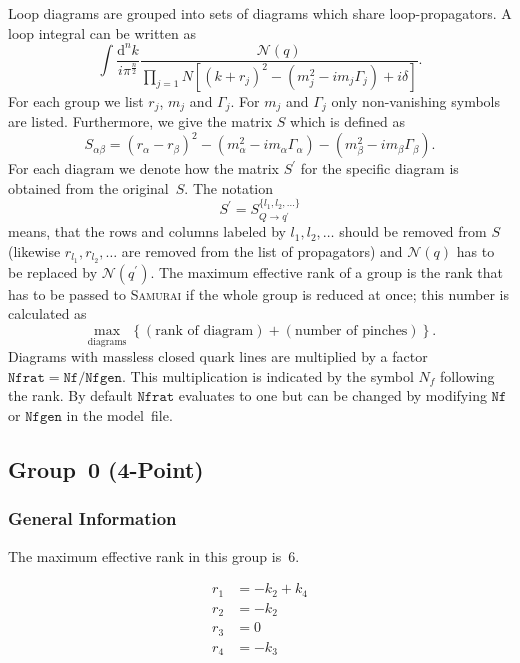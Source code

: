 \documentclass[a4paper]{article}
\begin{document}
Loop diagrams are grouped into sets of diagrams which share
loop-propagators. A loop integral can be written as
\begin{equation}
\int\!\frac{\mathrm{d}^nk}{i\pi^{\frac{n}{2}}}%
\frac{\mathcal{N}(q)}{\prod_{j=1}{N}\left[(k+r_j)^2-(m_j^2
   -i m_j\Gamma_j) + i\delta\right]}.
\end{equation}
For each group we list $r_j$, $m_j$ and $\Gamma_j$.
For $m_j$ and $\Gamma_j$ only non-vanishing symbols are listed.
Furthermore, we give the matrix $S$ which is defined as
\begin{equation}
S_{\alpha\beta} = (r_\alpha-r_\beta)^2
-(m_\alpha^2-im_\alpha\Gamma_\alpha)
-(m_\beta^2-im_\beta\Gamma_\beta).
\end{equation}
For each diagram we denote how the matrix $S^\prime$ for the specific diagram
is obtained from the original~$S$. The notation
\begin{equation}
S^\prime=S_{Q\to q^\prime}^{\{l_1,l_2,\ldots\}}
\end{equation}
means, that the rows and columns labeled by $l_1,l_2,\ldots$ should be
removed from $S$ (likewise $r_{l_1}, r_{l_2}, \ldots$ are removed from the
list of propagators) and $\mathcal{N}(q)$ has to be replaced by
$\mathcal{N}(q^\prime)$.
The maximum effective rank of a group is the rank that has to be passed
to \textsc{Samurai} if the whole group is reduced at once; this number
is calculated as
\begin{equation}
\max_{\text{diagrams}}\left\{(\text{rank of diagram})+
(\text{number of pinches})\right\}.
\end{equation}
Diagrams with massless closed quark lines are multiplied by a factor
$\mathtt{Nfrat}=\mathtt{Nf}/\mathtt{Nfgen}$. This multiplication is indicated
by the symbol $N_f$ following the rank. By default $\mathtt{Nfrat}$ evaluates
to one but can be changed by modifying $\mathtt{Nf}$ or $\mathtt{Nfgen}$ in the
model~file.


\subsection{Group~0 (4-Point)}
\subsubsection*{General Information}
The maximum effective rank in this group is~6.

\begin{subequations}
\begin{align}
r_{1} &= -k_{2}+k_{4}\\
r_{2} &= -k_{2}\\
r_{3} &= 0\\
r_{4} &= -k_{3}
\end{align}
\end{subequations}
\end{document}
